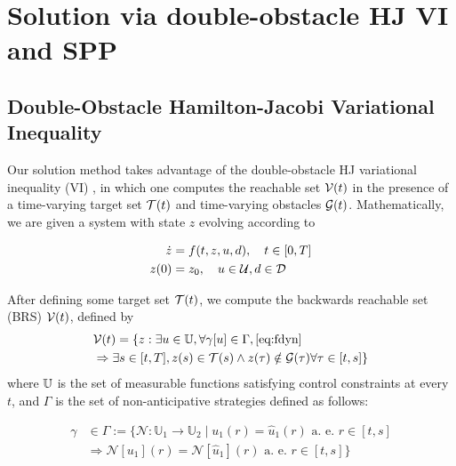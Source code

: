 \section{Solution via double-obstacle HJ VI and SPP\label{sec:solution}}
\subsection{Double-Obstacle Hamilton-Jacobi Variational Inequality}
Our solution method takes advantage of the double-obstacle HJ variational inequality (VI) \cite{Fisac15}, in which one computes the reachable set $\mathcal{V}(t)$ in the presence of a time-varying target set $\mathcal{T}(t)$ and time-varying obstacles $\mathcal{G}(t)$. Mathematically, we are given a system with state $z$ evolving according to

\begin{equation}
\label{eq:fdyn} %
\begin{aligned}
\dot{z} &= f(t, z, u, d), \quad t \in [0, T] \\
z(0) &= z_0, \quad u \in \cset, d \in \dset
\end{aligned}
\end{equation}

After defining some target set $\mathcal{T}(t)$, we compute the backwards reachable set (BRS) $\mathcal{V}(t)$, defined by
%
\begin{equation}
\label{eq:brs}
\begin{aligned}
&\mathcal{V}(t) = \{z: \exists u \in \mathbb{U}, \forall \gamma[u] \in \Gamma, \eqref{eq:fdyn} \\
&\Rightarrow \exists s \in [t, T], z(s) \in \mathcal{T}(s) \wedge z(\tau) \notin \mathcal{G}(\tau) \forall \tau \in [t, s]\}
\end{aligned}
\end{equation}
%
\noindent where $\mathbb{U}$ is the set of measurable functions satisfying control constraints at every $t$, and $\Gamma$ is the set of non-anticipative strategies \cite{Mitchell05} defined as follows:

\begin{equation}
\begin{aligned}
\gamma &\in \Gamma := \{\mathcal{N}: \mathbb{U}_1 \rightarrow \mathbb{U}_2 \mid  u_1(r) = \hat{u}_1(r) \text{ a. e. } r\in[t,s] \\
& \Rightarrow \mathcal{N}[u_1](r) = \mathcal{N}[\hat{u}_1](r) \text{ a. e. } r\in[t,s]\}
\end{aligned}
\end{equation}

